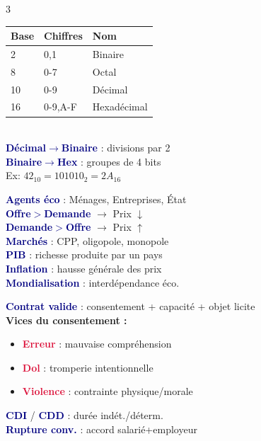 \documentclass[a4paper,9pt]{article}
\newcommand{\key}[1]{\textbf{\textcolor{navy}{#1}}}
\newcommand{\warn}[1]{\textbf{\textcolor{crimson}{#1}}}
\begin{document}
\begin{multicols}{3}
\begin{tcolorbox}[basebox, colframe=navy, title=MATHS — Bases de numération]
{\footnotesize
\begin{tabularx}{\columnwidth}{@{}llX@{}}
\textbf{Base} & \textbf{Chiffres} & \textbf{Nom} \\
\hline
2  & 0,1     & Binaire \\
8  & 0-7     & Octal \\
10 & 0-9     & Décimal \\
16 & 0-9,A-F & Hexadécimal \\
\end{tabularx}}
\vspace{2pt} \\
\key{Décimal$\to$Binaire} : divisions par 2 \\
\key{Binaire$\to$Hex} : groupes de 4 bits \\
Ex: $42_{10} = 101010_2 = 2A_{16}$
\end{tcolorbox}

\begin{tcolorbox}[basebox, colframe=teal, title=CEJM — Économie]
\key{Agents éco} : Ménages, Entreprises, État \\
\key{Offre$>$Demande} $\to$ Prix $\downarrow$ \\
\key{Demande$>$Offre} $\to$ Prix $\uparrow$ \\
\key{Marchés} : CPP, oligopole, monopole \\
\key{PIB} : richesse produite par un pays \\
\key{Inflation} : hausse générale des prix \\
\key{Mondialisation} : interdépendance éco.
\end{tcolorbox}

\begin{tcolorbox}[basebox, colframe=teal, title=CEJM — Droit des contrats]
\key{Contrat valide} : consentement + capacité + objet licite \\[2pt]
\textbf{Vices du consentement :}
\begin{itemize}
  \item \warn{Erreur} : mauvaise compréhension
  \item \warn{Dol} : tromperie intentionnelle
  \item \warn{Violence} : contrainte physique/morale
\end{itemize}
\key{CDI} / \key{CDD} : durée indét./déterm. \\
\key{Rupture conv.} : accord salarié+employeur
\end{tcolorbox}


\end{multicols}
\end{document}
